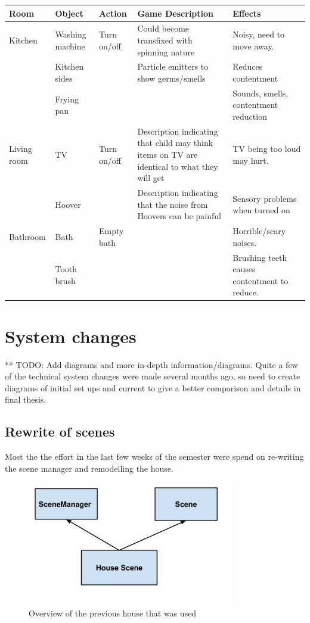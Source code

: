 \documentclass[11pt]{report}
\begin{document}
\begin{table}[H]
    \begin{tabular}{| p{2cm} | p{2cm} | p{3cm} | p{3cm} | p{4cm} | }
    \hline
    Room & Object & Action & Game Description & Effects                                                                  \\
    \hline
    \hline
        Kitchen & Washing machine & Turn on/off & Could become transfixed with spinning nature & Noisy, need to move away. \\
    \hline
    & Kitchen sides & & Particle emitters to show germs/smells & Reduces contentment \\
    \hline
    & Frying pan & & & Sounds, smells, contentment reduction \\
    \hline
    Living room & TV & Turn on/off & Description indicating that child may think items on TV are identical to what they will get & TV being too loud may hurt. \\
    \hline
    & Hoover & & Description indicating that the noise from Hoovers can be painful & Sensory problems when turned on \\
    \hline
    Bathroom & Bath & Empty bath & & Horrible/scary noises. \\
    \hline
    & Tooth brush & & & Brushing teeth causes contentment to reduce. \\
    \hline
    \end{tabular}
\end{table}


\section{System changes}
** TODO: Add diagrams and more in-depth information/diagrams. Quite a few of the technical system changes were made several months ago, so need to create diagrams of initial set ups and current to give a better comparison and details in final thesis.

\subsection{Rewrite of scenes}
Most the the effort in the last few weeks of the semester were spend on re-writing the scene manager and remodelling the house. 

\begin{figure}[H]
\centering
\includegraphics[width=90mm]{images/scenemanager.jpg}
\caption{Overview of the previous house that was used}
\label{old_house}
\end{figure}
\end{document}
